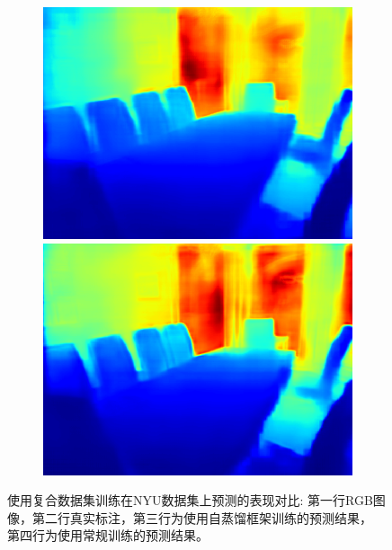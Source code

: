 \begin{figure}[htb]
\begin{subfigure}{0.15\linewidth}
\begin{minipage}[t]{1\linewidth}
  \includegraphics[width=1\linewidth]{figure/nyu_result/dining_room_rgb_01399.png}
  \includegraphics[width=1\linewidth]{figure/nyu_without/dining_room_rgb_01399.png}
  \end{minipage}%
  \end{subfigure}
  \centering
  \caption{使用复合数据集训练在NYU数据集上预测的表现对比:
   第一行RGB图像，第二行真实标注，第三行为使用自蒸馏框架训练的预测结果，
   第四行为使用常规训练的预测结果。}
  \label{nyu visualization result}
  \end{figure}
